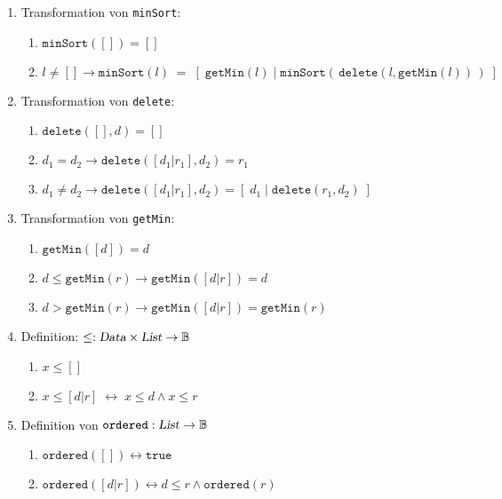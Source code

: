 \documentclass{article}
\begin{document}
\begin{enumerate}
\item Transformation von \texttt{minSort}:
    \begin{enumerate}
    \item $\mathtt{minSort}([]) = []$
    \item $l \not=[] \rightarrow \mathtt{minSort}(l) \;=\; [\; \mathtt{getMin}(l) \;|\; \mathtt{minSort}(\,\mathtt{delete}(l, \mathtt{getMin}(l))\,)\;]$
    \end{enumerate}
\item Transformation von \texttt{delete}:
    \begin{enumerate}
    \item $\texttt{delete}([],d) = []$
    \item $d_1 = d_2 \rightarrow \mathtt{delete}([d_1|r_1], d_2) = r_1$
    \item $d_1 \not= d_2 \rightarrow \mathtt{delete}([d_1|r_1], d_2) = [\;d_1 \;|\; \mathtt{delete}(r_1, d_2)\;]$
    \end{enumerate}
\item Transformation von \texttt{getMin}:
    \begin{enumerate}
    \item $\mathtt{getMin}([d]) = d$
    \item $d \leq \mathtt{getMin}(r) \rightarrow \mathtt{getMin}([d|r]) = d$
    \item $d >    \mathtt{getMin}(r) \rightarrow \mathtt{getMin}([d|r]) = \mathtt{getMin}(r)$
    \end{enumerate}
\item Definition: $\leq : \textsl{Data} \times \textsl{List} \rightarrow \mathbb{B}$
    \begin{enumerate}
    \item $x \leq []$
    \item $x \leq [d|r] \;\leftrightarrow\; x \leq d \wedge x \leq r$
    \end{enumerate}
\item Definition von $\texttt{ordered}: \textsl{List} \rightarrow \mathbb{B}$
\begin{enumerate}
\item $\mathtt{ordered}([]) \leftrightarrow \mathtt{true}$
\item $\mathtt{ordered}([d|r]) \leftrightarrow d \leq r \wedge \mathtt{ordered}(r)$
\end{enumerate}
\end{enumerate}
\end{document}
